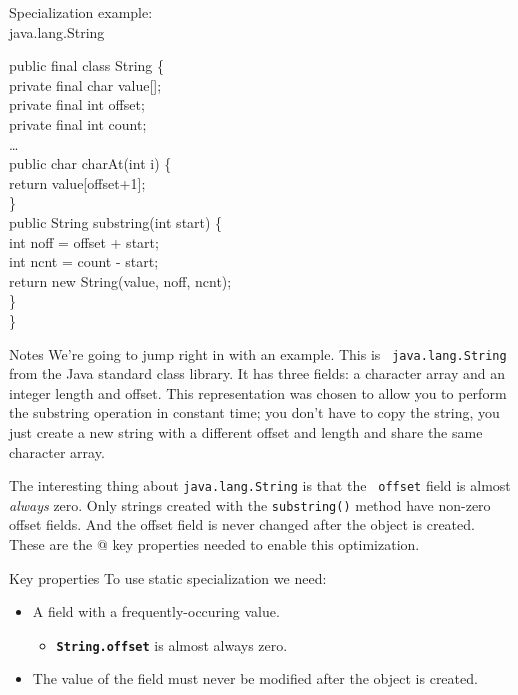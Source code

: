 \documentclass[%
pdf,
colorBG,
slideColor,
nototal,
oqe
]{prosper}
\newenvironment{talknotes}{\begin{slide}{Notes}\tiny}{\end{slide}}
\begin{document}
\begin{slide}{Specialization example:\\\small java.lang.String}
\fontsize{9}{9}%
\bfseries\begin{samplecode}%
public final class String \{\\
\>private final char value[];\\
\>private final int offset;\\
\>private final int count;\\
\>\ldots\\
\>public char charAt(int i) \{\\
\>\>return value[offset+1];\\
\>\}\\
\>public String substring(int start) \{\\
\>\>int noff = offset + start;\\
\>\>int ncnt = count - start;\\
\>\>return new String(value, noff, ncnt);\\
\>\}\\
\}\\
\end{samplecode}
\end{slide}

\begin{talknotes}
We're going to jump right in with an example.  This is {\tt
  java.lang.String} from the Java standard class library.  It has
three fields: a character array and an integer length and offset.
This representation was chosen to allow you to perform the substring
operation in constant time; you don't have to copy the string, you
just create a new string with a different offset and length and
share the same character array.

The interesting thing about {\tt java.lang.String} is that the {\tt
  offset} field is almost \emph{always} zero.  Only strings created
with the {\tt substring()} method have non-zero offset fields. 
And the offset field is never changed after the object is created.
These are the @ key properties needed to enable this optimization.
\end{talknotes}

\begin{slide}{Key properties}
To use static specialization we need:
\begin{itemize}
 \item A field with a frequently-occuring value.
  \begin{itemize}\small
   \item {\tt\bfseries String.offset} is almost always zero.
  \end{itemize}
 \item The value of the field must never be modified after the object
       is created.
\end{itemize}
\end{slide}
\end{document}
